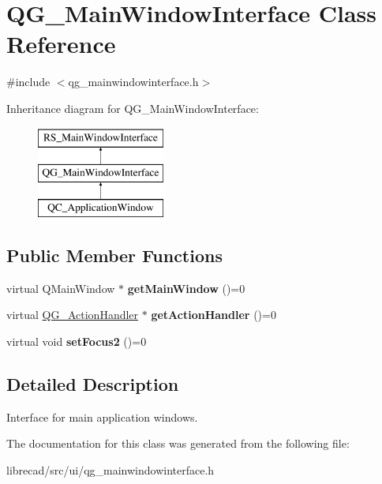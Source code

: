\hypertarget{classQG__MainWindowInterface}{\section{Q\-G\-\_\-\-Main\-Window\-Interface Class Reference}
\label{classQG__MainWindowInterface}
}


{\ttfamily \#include $<$qg\-\_\-mainwindowinterface.\-h$>$}

Inheritance diagram for Q\-G\-\_\-\-Main\-Window\-Interface\-:\begin{figure}[H]
\begin{center}
\leavevmode
\includegraphics[height=3.000000cm]{classQG__MainWindowInterface}
\end{center}
\end{figure}
\subsection*{Public Member Functions}
\begin{DoxyCompactItemize}
\item 
\hypertarget{classQG__MainWindowInterface_ac80f971bdbd4c4e598f8eec2001ce3c8}{virtual Q\-Main\-Window $\ast$ {\bfseries get\-Main\-Window} ()=0}\label{classQG__MainWindowInterface_ac80f971bdbd4c4e598f8eec2001ce3c8}

\item 
\hypertarget{classQG__MainWindowInterface_add452909e4c41fa937fcce5a0fd14d9b}{virtual \hyperlink{classQG__ActionHandler}{Q\-G\-\_\-\-Action\-Handler} $\ast$ {\bfseries get\-Action\-Handler} ()=0}\label{classQG__MainWindowInterface_add452909e4c41fa937fcce5a0fd14d9b}

\item 
\hypertarget{classQG__MainWindowInterface_a0ebeeb631db92988fe0096441cc65472}{virtual void {\bfseries set\-Focus2} ()=0}\label{classQG__MainWindowInterface_a0ebeeb631db92988fe0096441cc65472}

\end{DoxyCompactItemize}


\subsection{Detailed Description}
Interface for main application windows. 

The documentation for this class was generated from the following file\-:\begin{DoxyCompactItemize}
\item 
librecad/src/ui/qg\-\_\-mainwindowinterface.\-h\end{DoxyCompactItemize}
